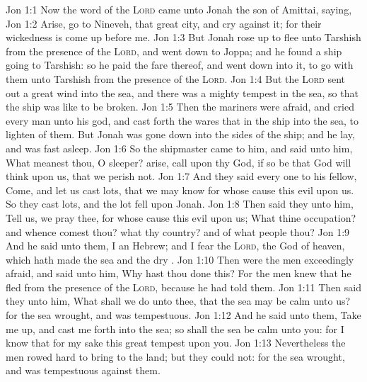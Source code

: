\vs Jon 1:1 Now the word of the \textsc{Lord} came unto Jonah the son of Amittai, saying,
\vs Jon 1:2 Arise, go to Nineveh, that great city, and cry against it; for their wickedness is come up before me.
\vs Jon 1:3 But Jonah rose up to flee unto Tarshish from the presence of the \textsc{Lord}, and went down to Joppa; and he found a ship going to Tarshish: so he paid the fare thereof, and went down into it, to go with them unto Tarshish from the presence of the \textsc{Lord}.
\vs Jon 1:4 But the \textsc{Lord} sent out a great wind into the sea, and there was a mighty tempest in the sea, so that the ship was like to be broken.
\vs Jon 1:5 Then the mariners were afraid, and cried every man unto his god, and cast forth the wares that  in the ship into the sea, to lighten  of them. But Jonah was gone down into the sides of the ship; and he lay, and was fast asleep.
\vs Jon 1:6 So the shipmaster came to him, and said unto him, What meanest thou, O sleeper? arise, call upon thy God, if so be that God will think upon us, that we perish not.
\vs Jon 1:7 And they said every one to his fellow, Come, and let us cast lots, that we may know for whose cause this evil  upon us. So they cast lots, and the lot fell upon Jonah.
\vs Jon 1:8 Then said they unto him, Tell us, we pray thee, for whose cause this evil  upon us; What  thine occupation? and whence comest thou? what  thy country? and of what people  thou?
\vs Jon 1:9 And he said unto them, I  an Hebrew; and I fear the \textsc{Lord}, the God of heaven, which hath made the sea and the dry .
\vs Jon 1:10 Then were the men exceedingly afraid, and said unto him, Why hast thou done this? For the men knew that he fled from the presence of the \textsc{Lord}, because he had told them.
\vs Jon 1:11 Then said they unto him, What shall we do unto thee, that the sea may be calm unto us? for the sea wrought, and was tempestuous.
\vs Jon 1:12 And he said unto them, Take me up, and cast me forth into the sea; so shall the sea be calm unto you: for I know that for my sake this great tempest  upon you.
\vs Jon 1:13 Nevertheless the men rowed hard to bring  to the land; but they could not: for the sea wrought, and was tempestuous against them.
